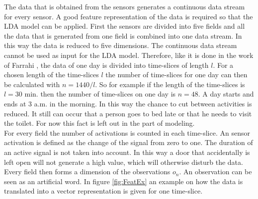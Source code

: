 The data that is obtained from the sensors generates a continuous data stream for every sensor. A good feature representation of the data is required so that the LDA model can be applied. First the sensors are divided into five fields and all the data that is generated from one field is combined into one data stream. In this way the data is reduced to five dimensions. 
The continuous data stream cannot be used as input for the LDA model. Therefore, like it is done in the work of Farrahi \cite{farrahi2008daily}, the data of one day is divided into time-slices of length $l$. For a chosen length of the time-slices $l$ the number of time-slices for one day can then be calculated with $n=1440/l$. So for example if the length of the time-slices is $l=30$ min. then the number of time-slices on one day is $n=48$. A day starts and ends at 3 a.m. in the morning. In this way the chance to cut between activities is reduced. It still can occur that a person goes to bed late or that he needs to visit the toilet. For now this fact is left out in the part of modeling.\\

For every field  the number of activations is counted in each time-slice. An sensor activation is defined as the change of the signal from zero  to one. The duration of an active signal is not taken into account. In this way a door that accidentally is left open will not generate a high value, which will otherwise disturb the data. Every field then forms a dimension of the observations $o_n$. An observation can be seen as an artificial word. In figure \ref{fig:FeatEx} an example on how the data is translated into a vector representation is given for one time-slice.\\

